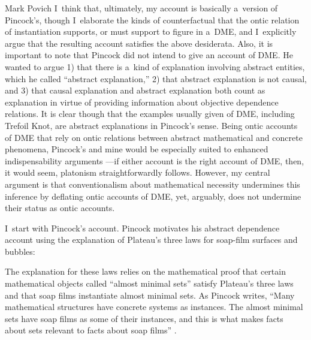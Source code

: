 \begin{artengenv}{Mark Povich}
I~think that, ultimately, my account is basically a~version of Pincock's, though I~elaborate the kinds of counterfactual that the ontic relation of instantiation supports, or must support to figure in a~DME, and I~explicitly argue that the resulting account satisfies the above desiderata. Also, it is important to note that Pincock did not intend to give an account of DME. He wanted to argue 1) that there is a~kind of explanation involving abstract entities, which he called ``abstract explanation,'' 2) that abstract explanation is not causal, and 3) that causal explanation and abstract explanation both count as explanation in virtue of providing information about objective dependence relations. It is clear though that the examples usually given of DME, including Trefoil Knot, are abstract explanations in Pincock's sense. Being ontic accounts of DME that rely on ontic relations between abstract mathematical and concrete phenomena, Pincock's and mine would be especially suited to enhanced indispensability arguments
\parencite[][]{baker_mathematical_2009}%
---if either account is the right account of DME, then, it would seem, platonism straightforwardly follows. However, my central argument is that conventionalism about mathematical necessity undermines this inference by deflating ontic accounts of DME, yet, arguably, does not undermine their status as ontic accounts.

I~start with Pincock's
\parencite*[][]{pincock_abstract_2015} %
 account. Pincock motivates his abstract dependence account using the explanation of Plateau's three laws for soap-film surfaces and bubbles:

The explanation for these laws relies on the mathematical proof that certain mathematical objects called ``almost minimal sets'' satisfy Plateau's three laws and that soap films instantiate almost minimal sets. As Pincock writes, ``Many mathematical structures have concrete systems as instances. The almost minimal sets have soap films as some of their instances, and this is what makes facts about sets relevant to facts about soap films''
\parencite[][pp.865–866]{pincock_abstract_2015}.%



\end{artengenv}

